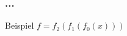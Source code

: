 \begin{frame}
	\frametitle{...}
		\begin{exampleblock}{Beispiel}
			\(f=f_{2}(f_{1}(f_{0}(x)))\) 
		\end{exampleblock}
\end{frame}



